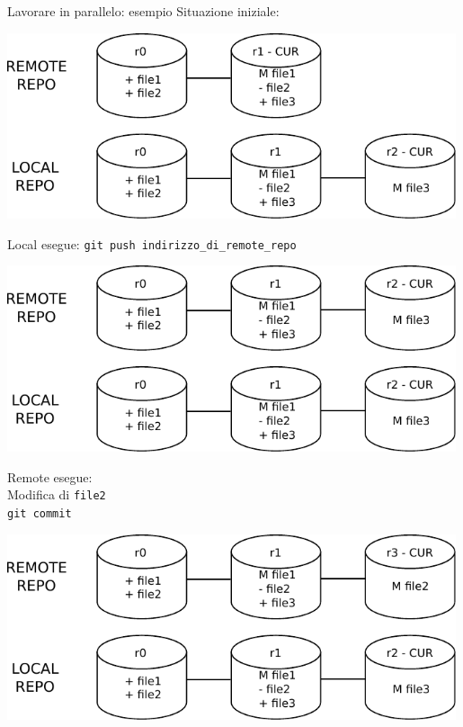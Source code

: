 \documentclass[presentation]{beamer}
\begin{document}
\begin{frame}{Lavorare in parallelo: esempio}
	Situazione iniziale:
	\begin{center}
		\includegraphics[width=0.99\textwidth]{img/draw5}
	\end{center}
	\framebreak{}
	
	Local esegue: \texttt{git push indirizzo\_di\_remote\_repo}
	\begin{center}
		\includegraphics[width=0.99\textwidth]{img/draw6}
	\end{center}
	\framebreak{}
	
	Remote esegue:\\
	Modifica di \texttt{file2} \\
	\texttt{git commit} \\
	\begin{center}
		\includegraphics[width=0.99\textwidth]{img/draw7}
	\end{center}
	\framebreak{}
	

\end{frame}
\end{document}
